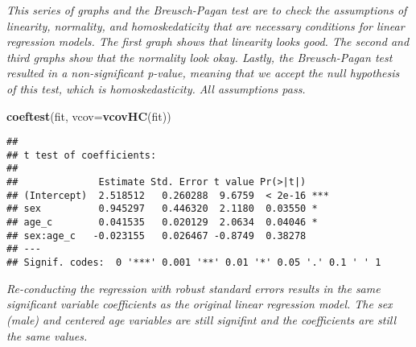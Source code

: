 \documentclass[]{article}
\newenvironment{Shaded}{\begin{snugshade}}{\end{snugshade}}
\newcommand{\DataTypeTok}[1]{\textcolor[rgb]{0.13,0.29,0.53}{#1}}
\newcommand{\DecValTok}[1]{\textcolor[rgb]{0.00,0.00,0.81}{#1}}
\newcommand{\KeywordTok}[1]{\textcolor[rgb]{0.13,0.29,0.53}{\textbf{#1}}}
\newcommand{\NormalTok}[1]{#1}
\newcommand{\OperatorTok}[1]{\textcolor[rgb]{0.81,0.36,0.00}{\textbf{#1}}}
\begin{document}
\emph{This series of graphs and the Breusch-Pagan test are to check the
assumptions of linearity, normality, and homoskedaticity that are
necessary conditions for linear regression models. The first graph shows
that linearity looks good. The second and third graphs show that the
normality look okay. Lastly, the Breusch-Pagan test resulted in a
non-significant p-value, meaning that we accept the null hypothesis of
this test, which is homoskedasticity. All assumptions pass.}

\begin{Shaded}
\begin{Highlighting}[]
\KeywordTok{coeftest}\NormalTok{(fit, }\DataTypeTok{vcov=}\KeywordTok{vcovHC}\NormalTok{(fit))}
\end{Highlighting}
\end{Shaded}

\begin{verbatim}
## 
## t test of coefficients:
## 
##              Estimate Std. Error t value Pr(>|t|)    
## (Intercept)  2.518512   0.260288  9.6759  < 2e-16 ***
## sex          0.945297   0.446320  2.1180  0.03550 *  
## age_c        0.041535   0.020129  2.0634  0.04046 *  
## sex:age_c   -0.023155   0.026467 -0.8749  0.38278    
## ---
## Signif. codes:  0 '***' 0.001 '**' 0.01 '*' 0.05 '.' 0.1 ' ' 1
\end{verbatim}

\emph{Re-conducting the regression with robust standard errors results
in the same significant variable coefficients as the original linear
regression model. The sex (male) and centered age variables are still
signifint and the coefficients are still the same values. }

\begin{Shaded}
\end{Shaded}
\end{document}

